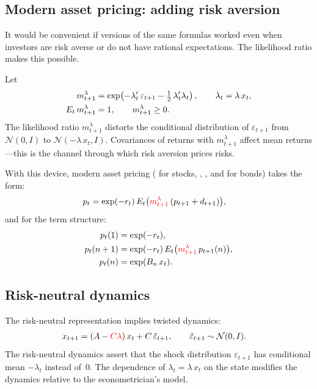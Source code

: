 \documentclass[12pt]{article}
\theoremstyle{definition}
\begin{document}
\subsection{Modern asset pricing: adding risk aversion}
\label{sec:modern-ap}

It would be convenient if versions of the same formulas worked even when
investors are risk averse or do not have rational expectations.  The
likelihood ratio makes this possible.

Let
\begin{align}
m_{t+1}^\lambda &= \exp\!\left(-\lambda_t'\, \varepsilon_{t+1}
    - \tfrac{1}{2}\,\lambda_t'\lambda_t\right), \qquad
    \lambda_t = \lambda\, x_t, \label{eq:sdf-lr}\\
E_t\, m_{t+1}^\lambda &= 1, \qquad m_{t+1}^\lambda \geq 0. \notag
\end{align}
The likelihood ratio $m_{t+1}^\lambda$ distorts the conditional
distribution of $\varepsilon_{t+1}$ from ${\mathcal N}(0,I)$ to
${\mathcal N}(-\lambda\, x_t, I)$.  Covariances of returns with
$m_{t+1}^\lambda$ affect mean returns---this is the channel through
which risk aversion prices risks.

With this device, modern asset pricing (\citealt{Lucas1978} for stocks,
\citealt{DS2000}, \citealt{cox1985theory}, and \citealt{BZ1994} for bonds) takes the form:
\begin{align}
p_t &= \exp(-r_t)\, E_t\bigl(
    {\color{red} m_{t+1}^\lambda}\,(p_{t+1} + d_{t+1})\bigr),
    \label{eq:stock-lr}
\end{align}
and for the term structure:
\begin{align}
p_t(1) &= \exp(-r_t), \notag\\
p_t(n+1) &= \exp(-r_t)\, E_t\bigl(
    {\color{red} m_{t+1}^\lambda}\, p_{t+1}(n)\bigr), \label{eq:ts-lr}\\
p_t(n) &= \exp(B_n\, x_t). \notag
\end{align}

\subsection{Risk-neutral dynamics}

The risk-neutral representation implies twisted dynamics:
\begin{align*}
x_{t+1} &= (A - {\color{red} C\lambda})\, x_t
    + C\, \tilde\varepsilon_{t+1}, \qquad
    \tilde\varepsilon_{t+1} \sim {\mathcal N}(0,I).
\end{align*}
The risk-neutral dynamics assert that the shock distribution
$\varepsilon_{t+1}$ has conditional mean $-\lambda_t$ instead of~$0$.
The dependence of $\lambda_t = \lambda\, x_t$ on the state modifies
the dynamics relative to the econometrician's model.
\end{document}
